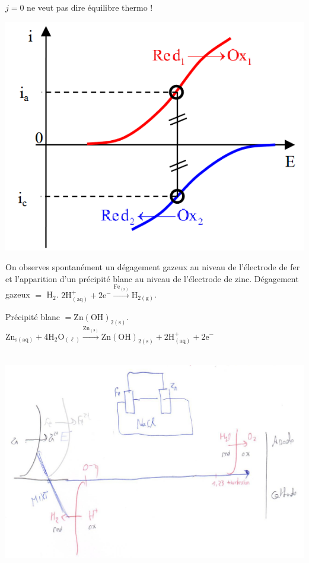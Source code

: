 \begin{solution}

\begin{questions}
    \questioncours $j=0$ ne veut pas dire équilibre thermo !

    \begin{center}
        \includegraphics[scale=1.]{chimie/i-E/iE-cours3.png}
    \end{center}
    On observes spontanément un dégagement gazeux au niveau de l’électrode de fer et l’apparition d’un précipité blanc au niveau de l’électrode de zinc.
    \question Dégagement gazeux $=$ H$_2$. $\mathrm{2H^+_{(aq)} + 2 e^- \xrightarrow{Fe_{(s)}} H_{2(g)} }$.
    
    Précipité blanc $= \mathrm{Zn(OH)_{2(s)}}$. $\mathrm{Zn_{s(aq)} + 4 H_2O_{(\ell)} \xrightarrow{Zn_{(s)}} Zn(OH)_{2(s)} + 2H^+_{(aq)} + 2 e^- }$
    
~\includegraphics[width=\linewidth]{chimie/i-E/iE-corr2.jpg} 
\end{questions}

\end{solution}

